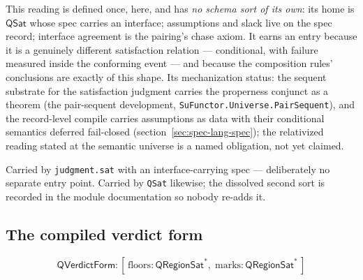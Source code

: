 This reading is defined once, here, and has \emph{no schema sort of
its own}: its home is $\mathsf{QSat}$ whose spec carries an
interface; assumptions and slack live on the spec record; interface
agreement is the pairing's chase axiom. It earns an entry because it
is a genuinely different satisfaction relation --- conditional, with
failure measured inside the conforming event --- and because the
composition rules' conclusions are exactly of this shape. Its
mechanization status: the sequent substrate for the
satisfaction judgment carries the properness conjunct as a theorem
(the pair-sequent development,
\texttt{SuFunctor.Universe.PairSequent}), and the record-level
compile carries assumptions as data with their conditional semantics
deferred fail-closed (section~\ref{sec:spec-lang-spec}); the
relativized reading stated at the semantic universe is a named
obligation, not yet claimed.

Carried by \texttt{judgment.sat} with an interface-carrying spec ---
deliberately no separate entry point.
Carried by \texttt{QSat} likewise; the dissolved second sort is
recorded in the module documentation so nobody re-adds it.

\subsection{The compiled verdict form}
\label{sec:spec-lang-verdictform}

\[
\mathsf{QVerdictForm} : [\, \mathrm{floors} : \mathsf{QRegionSat}^{*},\;
  \mathrm{marks} : \mathsf{QRegionSat}^{*} \,]
\]

